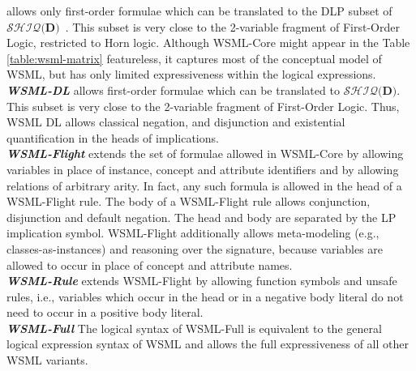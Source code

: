   allows only first-order
formulae which can be translated to the DLP subset of
$\mathcal{SHIQ}(\mathbf{D)}$~\cite{Grosof+HorrocksETAL-DescLogiProg:03}. This subset is very
close to the 2-variable fragment of First-Order Logic, restricted
to Horn logic. Although WSML-Core might appear in the Table
\ref{table:wsml-matrix} featureless, it captures most of the
conceptual model of WSML, but has only limited expressiveness
within the logical expressions.
\\
{\sl \bfseries WSML-DL} allows first-order formulae which can be
translated to $\mathcal{SHIQ}(\mathbf{D)}$. This subset is very
close to the 2-variable fragment of First-Order Logic. Thus, WSML
DL allows classical negation, and disjunction and existential
quantification in the heads of implications.
\\
{\sl \bfseries WSML-Flight} extends the set of formulae allowed
in WSML-Core by allowing variables in place of instance, concept
and attribute identifiers and by allowing relations of arbitrary
arity. In fact, any such formula is allowed in the head of a
WSML-Flight rule. The body of a WSML-Flight rule allows
conjunction, disjunction and default negation. The head and body
are separated by the LP implication symbol. WSML-Flight
additionally allows meta-modeling (e.g., classes-as-instances) and
 reasoning over the signature, because variables are allowed to
occur in place of concept and attribute names.
\\
{\sl \bfseries WSML-Rule} extends WSML-Flight by allowing
function symbols and unsafe rules, i.e., variables which occur in
the head or in a negative body literal do not need to occur in a
positive body literal.
\\
{\sl \bfseries WSML-Full} The logical syntax of WSML-Full is
equivalent to the general logical expression syntax of WSML and
allows the full expressiveness of all other WSML variants.
%
%
